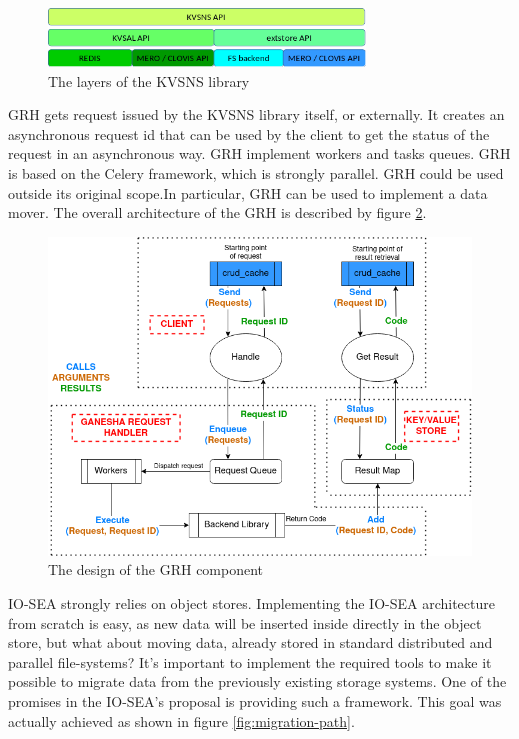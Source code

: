 \begin{figure}[H]
    \centering
    \includegraphics[width=0.75\textwidth]{FIGS/KVSNS_architecture.png}
    \caption[KVSNS layers]{ The layers of the KVSNS library}
    \label{fig:kvsns}
\end{figure}

GRH gets request issued by the KVSNS library itself, or externally. It creates an asynchronous request id that
can be used by the client to get the status of the request in an asynchronous way. GRH implement workers and 
tasks queues. GRH is based on the Celery framework, which is strongly parallel. GRH could be used outside its
original scope.In particular, GRH can be used to implement a data mover. The overall architecture of the GRH is
described by figure \ref{fig:grh}. 

\begin{figure}[H]
    \centering
    \includegraphics[width=\textwidth]{FIGS/GRH.png}
    \caption[GRH architecture]{ The design of the GRH component}
    \label{fig:grh}
\end{figure}

IO-SEA strongly relies on object stores. Implementing the IO-SEA architecture from scratch is easy, as new
data will be inserted inside directly in the object store, but what about moving data, already stored in standard
distributed and parallel file-systems? It's important to implement the required tools to make it possible to 
migrate data from the previously existing storage systems. One of the promises in the IO-SEA's proposal is 
providing such a framework. This goal was actually achieved as shown in figure \ref{fig:migration-path}. 

